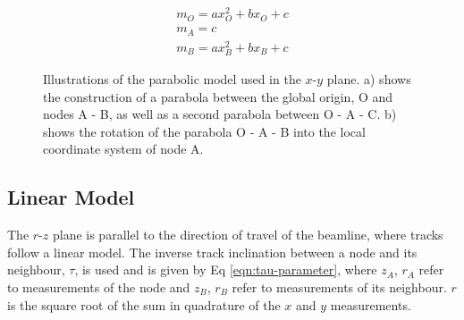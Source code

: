 \begin{equation}
\begin{aligned}
m_O = ax_{O}^{2} + bx_O + c \\
m_A = c \\
m_B = ax_{B}^{2} + bx_B + c
\end{aligned}
\label{eqn:parabolic-equations}
\end{equation}

\begin{figure}[htbp!] 
    \centering
    \hfill%
    \caption{Illustrations of the parabolic model used in the $x$-$y$ plane. a) shows the construction of a parabola between the global origin, O and nodes A - B, as well as a second parabola between O - A - C. b) shows the rotation of the parabola O - A - B into the local coordinate system of node A.}
    \label{fig:gnn-parabolic-model}
\end{figure}


\subsection{Linear Model}
\label{linear-state}

The $r$-$z$ plane is parallel to the direction of travel of the beamline, where tracks follow a linear model. The inverse track inclination between a node and its neighbour, $\tau$, is used and is given by Eq \eqref{eqn:tau-parameter}, where $z_A$, $r_A$ refer to measurements of the node and $z_B$, $r_B$ refer to measurements of its neighbour. $r$ is the square root of the sum in quadrature of the $x$ and $y$ measurements.

